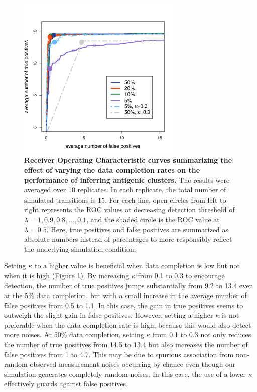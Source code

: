 \documentclass[11pt,oneside,letterpaper]{article}
\begin{document}
\begin{figure}[h]
	\centering		
	\includegraphics[width=0.7\textwidth]{figures/custom/avgTrueVsFalsePositives-completionRate-10replicates}
	\caption{\textbf{Receiver Operating Characteristic curves summarizing the effect of varying the data completion rates on the performance of inferring antigenic clusters.} 
 The results were averaged over 10 replicates.	
 In each replicate, the total number of simulated transitions is 15.
For each line, open circles from left to right represents the ROC values at decreasing detection threshold of $\lambda=1,0.9, 0.8, ...,0.1$, and the shaded circle is the ROC value at $\lambda=0.5$.
Here, true positives and false positives are summarized as absolute numbers instead of percentages to more responsibly reflect the underlying simulation condition.
	 		} 
	
	\label{ROCSimulation} 
\end{figure}






Setting $\kappa$ to a higher value is beneficial when data completion is low but not when it is high (Figure \ref{ROCSimulation}). 
By increasing $\kappa$ from 0.1 to 0.3 to encourage detection, the number of true positives jumps substantially from 9.2 to 13.4 even at the 5\% data completion, but with a small increase in the average number of false positives from 0.5 to 1.1.
In this case, the gain in true positives seems to outweigh the slight gain in false positives.
However, setting a higher $\kappa$ is not preferable when the data completion rate is high, because this would also detect more noises. 
At 50\% data completion, setting $\kappa$ from 0.1 to 0.3 not only reduces the number of true positives from 14.5 to 13.4 but also increases the number of false positives from 1 to 4.7. 
This may be due to  spurious association from non-random observed measurement noises occurring by chance even though our simulation generates completely random noises. 
In this case, the use of a lower $\kappa$ effectively guards against false positives.







\newpage




\end{document}
